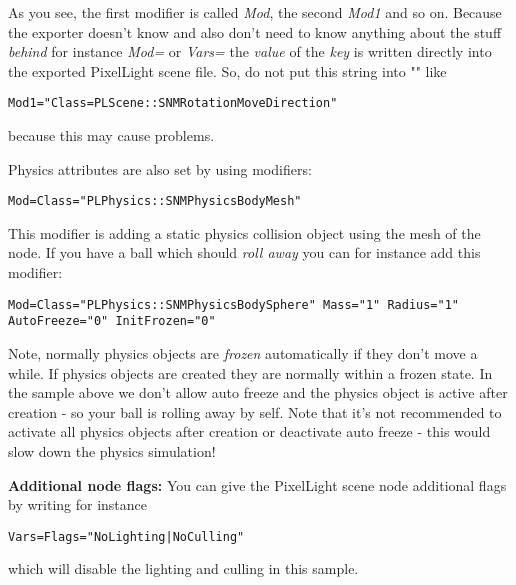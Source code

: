 As you see, the first modifier is called \emph{Mod}, the second \emph{Mod1} and so on. Because the exporter doesn't know and also don't need to know anything about the stuff \emph{behind} for instance \emph{Mod=} or \emph{Vars=} the \emph{value} of the \emph{key} is written directly into the exported PixelLight scene file. So, do not put this string into "" like

\begin{lstlisting}[caption=Invalid scene node modifier definition]
Mod1="Class=PLScene::SNMRotationMoveDirection"
\end{lstlisting}

because this may cause problems.

Physics attributes are also set by using modifiers:

\begin{lstlisting}[caption=Physics mesh scene node modifier]
Mod=Class="PLPhysics::SNMPhysicsBodyMesh"
\end{lstlisting}

This modifier is adding a static physics collision object using the mesh of the node. If you have a ball which should \emph{roll away} you can for instance add this modifier:

\begin{lstlisting}[caption=Physics sphere scene node modifier]
Mod=Class="PLPhysics::SNMPhysicsBodySphere" Mass="1" Radius="1" AutoFreeze="0" InitFrozen="0"
\end{lstlisting}

Note, normally physics objects are \emph{frozen} automatically if they don't move a while. If physics objects are created they are normally within a frozen state. In the sample above we don't allow auto freeze and the physics object is active after creation - so your ball is rolling away by self. Note that it's not recommended to activate all physics objects after creation or deactivate auto freeze - this would slow down the physics simulation!


\textbf{Additional node flags:}
You can give the PixelLight scene node additional flags by writing for instance

\begin{lstlisting}[caption=Setting scene node flags]
Vars=Flags="NoLighting|NoCulling"
\end{lstlisting}

which will disable the lighting and culling in this sample.
